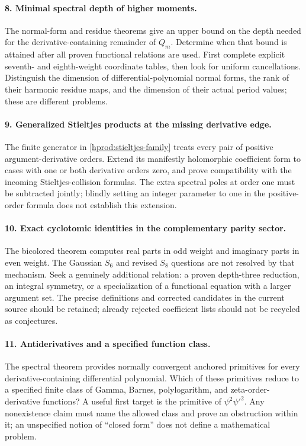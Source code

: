 \paragraph{8. Minimal spectral depth of higher moments.}
The normal-form and residue theorems give an upper bound on the
depth needed for the derivative-containing remainder of $Q_m$.
Determine when that bound is attained after all proven functional
relations are used.  First complete explicit seventh- and eighth-weight
coordinate tables, then look for uniform cancellations.
Distinguish the dimension of differential-polynomial normal forms,
the rank of their harmonic residue maps, and the dimension of their
actual period values; these are different problems.

\paragraph{9. Generalized Stieltjes products at the missing derivative edge.}
The finite generator in \eqref{hprod:stieltjes-family} treats every
pair of positive argument-derivative orders.  Extend its manifestly
holomorphic coefficient form to cases with one or both derivative
orders zero, and prove compatibility with the incoming
Stieltjes-collision formulas.  The extra spectral poles at order one
must be subtracted jointly; blindly setting an integer parameter to
one in the positive-order formula does not establish this extension.

\paragraph{10. Exact cyclotomic identities in the complementary parity sector.}
The bicolored theorem computes real parts in odd weight and imaginary
parts in even weight.  The Gaussian $S_6$ and revised $S_8$ questions
are not resolved by that mechanism.  Seek a genuinely additional
relation: a proven depth-three reduction, an integral symmetry, or a
specialization of a functional equation with a larger argument set.
The precise definitions and corrected candidates in the current
source should be retained; already rejected coefficient lists should
not be recycled as conjectures.

\paragraph{11. Antiderivatives and a specified function class.}
The spectral theorem provides normally convergent anchored primitives
for every derivative-containing differential polynomial.
Which of these primitives reduce to a specified finite class of
Gamma, Barnes, polylogarithm, and zeta-order-derivative functions?
A useful first target is the primitive of $\psi^2\psi'^2$.
Any nonexistence claim must name the allowed class and prove an
obstruction within it; an unspecified notion of ``closed form''
does not define a mathematical problem.

